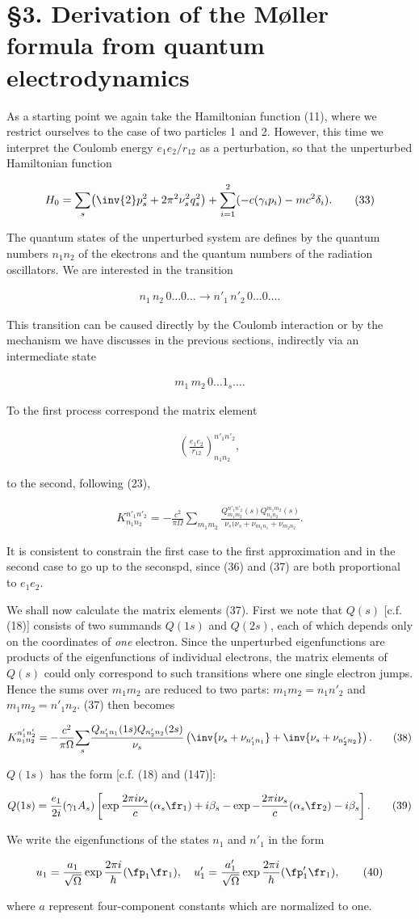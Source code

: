 \documentclass{article}
\newcommand{\nequ}[2]{
\begin{align*}
#1
\tag{#2}
\end{align*}
}
\newcommand{\sumXY}[2]{\underset{#1}{\overset{#2}{\sum}}}
\newcommand{\sumX}[1]{\underset{#1}{\sum}}
\begin{document}
\section*{§3. Derivation of the Møller formula from quantum electrodynamics}

As a starting point we again take the Hamiltonian function (11), where we restrict ourselves to the case of two particles 1 and 2. However, this time we interpret the Coulomb energy $e_1 e_2/r_{12}$ as a perturbation, so that the unperturbed Hamiltonian function
\nequ{
H_0 = \sumX{s}{\left(\inv{2}p_s^2 + 2\pi^2 \nu_s^2 q_s^2\right)}
 + \sumXY{i=1}{2}(-c(\gamma_i p_i) - mc^2 \delta_i).
}{33}
The quantum states of the unperturbed system are defines by the quantum numbers $n_1 n_2$ of the ekectrons and the quantum numbers of the radiation oscillators. We are interested in the transition
\nequ{
n_1\,n_2\,0\dots 0\dots \to n'_1\,n'_2\,0\dots 0\dots.
}{34}
This transition can be caused directly by the Coulomb interaction or by the mechanism we have discusses in the previous sections, indirectly via an intermediate state
\nequ{
m_1\,m_2\,0\dots 1_s\dots.
}{35}
To the first process correspond the matrix element
\nequ{
\left(\frac{e_1 e_2}{r_{12}}\right)_{n_1 n_2}^{n'_1 n'_2},
}{36}
to the second, following (23),
\nequ{
K_{n_1 n_2}^{n'_1 n'_2} = -\frac{c^2}{\pi\Omega}\sumX{m_1 m_2}\frac{
Q_{m_1 m_2}^{n'_1 n'_2}(s) Q_{n_1 n_2}^{m_1 m_2}(s)
}{\nu_s(\nu_s + \nu_{m_1 n_1} + \nu_{m_2 n_2}}.
}{37}
It is consistent to constrain the first case to the first approximation and in the second case to go up to the seconspd, since (36) and (37) are both proportional to $e_1 e_2$.

We shall now calculate the matrix elements (37). First we note that $Q(s)$ [c.f. (18)] consists of two summands $Q(1s)$ and $Q(2s)$, each of which depends only on the coordinates of \textit{one} electron. Since the unperturbed eigenfunctions are products of the eigenfunctions of individual electrons, the matrix elements of $Q(s)$ could only correspond to such transitions where one single electron jumps. Hence the sums over $m_1 m_2$ are reduced to two parts: $m_1 m_2 = n_1 n'_2$ and $m_1 m_2 = n'_1 n_2$. (37) then becomes
\nequ{
K_{n_1 n_2}^{n'_1 n'_2} = -\frac{c^2}{\pi\Omega}
\sumX{s}{\frac{Q_{n'_1 n_1}(1s) Q_{n'_2 n_2}(2s)}{\nu_s}}\left(
\inv{\nu_s + \nu_{n'_1 n_1}} + \inv{\nu_s + \nu_{n'_2 n_2}}
\right).
}{38}
$Q(1s)$ has the form [c.f. (18) and \cite{5} (147)]:
\nequ{
Q(1s) = \frac{e_1}{2i}(\gamma_1 A_s)\left[
\exp{\frac{2\pi i \nu_s}{c}(\alpha_s \fr_1) + i\beta_s} - 
\exp{-\frac{2\pi i \nu_s}{c}(\alpha_s \fr_2) - i\beta_s}
\right].
}{39}
We write the eigenfunctions of the states $n_1$ and $n'_1$ in the form
\nequ{
u_1 = \frac{a_1}{\sqrt{\Omega}}\exp{\frac{2\pi i}{h}(\fp_1 \fr_1)},\quad
u'_1 = \frac{a'_1}{\sqrt{\Omega}}\exp{\frac{2\pi i}{h}(\fp'_1 \fr_1)},
}{40}
where $a$ represent four-component constants which are normalized to one.
\end{document}
